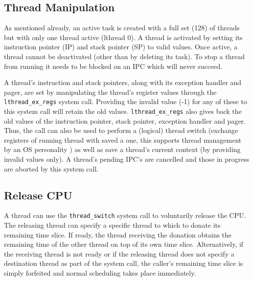 

\subsection{Thread Manipulation}
\label{sec:exregs}


As mentioned already, an active task is created with a full set (128) of
threads but with only one thread active (lthread 0). A thread is
activated by setting its instruction pointer (IP) and stack pointer (SP)
to valid values. Once active, a thread cannot be deactivated (other than
by deleting its task). To stop a thread from running it needs to be
blocked on an IPC which will never succeed.

A thread's instruction and stack pointers, along with its exception
handler and pager, are set by manipulating the thread's register
values through the {\footnotesize\verb+lthread_ex_regs+} system call. Providing the
invalid value (-1) for any of these to this system call will retain the old
values. {\footnotesize\verb+lthread_ex_regs+} also gives back the old values of the
instruction pointer, stack pointer, exception handler and pager. Thus,
the call can also be used to perform a (logical) thread switch
(exchange registers of running thread with saved a one, this supports
thread management by an OS personality ) as well as save a thread's
current context (by providing invalid values only). A thread's pending
IPC's are cancelled and those in progress are aborted by this system
call.


\subsection{Release CPU}


A thread can use the {\footnotesize\verb+thread_switch+} system call to voluntarily
release the CPU. The releasing thread can specify a specific thread to
which to donate its remaining time slice. If ready, the thread
receiving the donation obtains the remaining time of the other thread
on top of its own time slice. Alternatively, if the receiving thread
is not ready or if the releasing thread does not specify a destination
thread as part of the system call, the caller's remaining time slice
is simply forfeited and normal scheduling takes place immediately.

